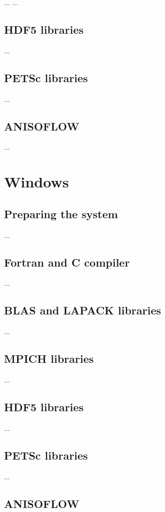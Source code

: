 ...
...
\subsection{HDF5 libraries}
...
\subsection{PETSc libraries}
...
\subsection{ANISOFLOW}
...
\section{Windows}
\subsection{Preparing the system}
...
\subsection{Fortran and C compiler}
...
\subsection{BLAS and LAPACK libraries}
...
\subsection{MPICH libraries}
...
\subsection{HDF5 libraries}
...
\subsection{PETSc libraries}
...
\subsection{ANISOFLOW}